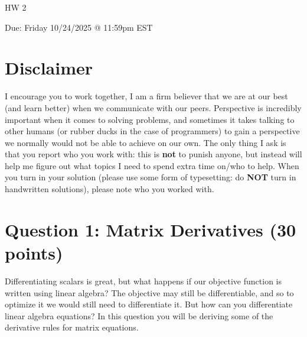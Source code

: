 \documentclass[11pt]{article}
\newcommand{\question}[1]{\section*{\normalsize #1}}
\begin{document}
\begin{center}
    {\Large \textsc{HW 2}}
\end{center}
\begin{center}
    Due: Friday 10/24/2025 @ 11:59pm EST
\end{center}

\section*{\textbf{Disclaimer}}
I encourage you to work together, I am a firm believer that we are at our best (and learn better) when we communicate with our peers. Perspective is incredibly important when it comes to solving problems, and sometimes it takes talking to other humans (or rubber ducks in the case of programmers) to gain a perspective we normally would not be able to achieve on our own. The only thing I ask is that you report who you work with: this is \textbf{not} to punish anyone, but instead will help me figure out what topics I need to spend extra time on/who to help. When you turn in your solution (please use some form of typesetting: do \textbf{NOT} turn in handwritten solutions), please note who you worked with.








\question{Question 1: Matrix Derivatives (30 points)}
Differentiating scalars is great, but what happens if our objective function is written using linear algebra? The objective may still be differentiable, and so to optimize it we would still need to differentiate it. But how can you differentiate linear algebra equations? In this question you will be deriving some of the derivative rules for matrix equations.\newline
\end{document}
